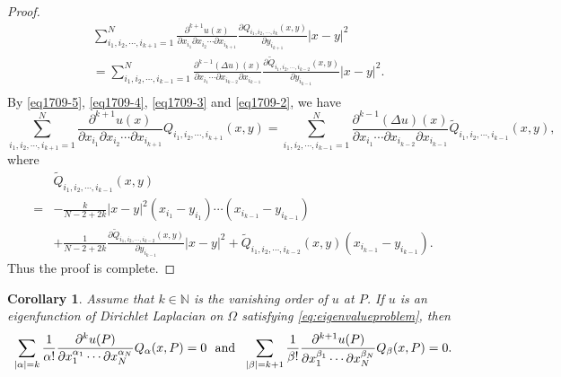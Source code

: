 \documentclass[11pt,reqno]{article}
\newtheorem{cor}[teo]{Corollary}
\numberwithin{equation}{section}
\newcommand\N{\mathbb N}
\renewcommand\O\Omega
\begin{document}
\begin{proof}
				\begin{equation}\label{eq1709-2}
					\begin{aligned}
						&\sum_{i_1,i_2,\cdots,i_{k+1}=1}^{N}\frac{\partial^{k+1} u(x)}{\partial x_{i_1} \partial x_{i_2}\cdots \partial x_{i_{k+1}}}\frac{\partial Q_{i_1,i_2,\cdots,i_k}(x,y)}{\partial y_{i_{k+1}}}|x-y|^2\\
						&=\sum_{i_1,i_2,\cdots,i_{k-1}=1}^{N}\frac{\partial^{k-1}(\Delta u)(x)}{\partial x_{i_1}\cdots \partial x_{i_{k-2}}\partial x_{i_{k-1}}}  \frac{\partial\widetilde{Q}_{i_1,i_2,\cdots,i_{k-2}}(x,y)}{\partial y_{i_{k-1}}}|x-y|^2.\\
					\end{aligned}
				\end{equation}
				By \eqref{eq1709-5}, \eqref{eq1709-4}, \eqref{eq1709-3} and \eqref{eq1709-2}, we have 
				\begin{equation}
					\sum_{i_1,i_2,\cdots,i_{k+1}=1}^{N}\frac{\partial^{k+1} u(x)}{\partial x_{i_1} \partial x_{i_2}\cdots \partial x_{i_{k+1}}}Q_{i_1,i_2,\cdots,i_{k+1}}(x,y)=\sum_{i_1,i_2,\cdots,i_{k-1}=1}^{N}\frac{\partial^{k-1}(\Delta u)(x)}{\partial x_{i_1}\cdots \partial x_{i_{k-2}}\partial x_{i_{k-1}}} \widetilde{Q}_{i_1,i_2,\cdots,i_{k-1}}(x,y),
				\end{equation}
				where $$
				\begin{aligned}
					&\widetilde{Q}_{i_1,i_2,\cdots,i_{k-1}}(x,y)\\
                    =&-\frac{k}{N-2+2k}|x-y|^2(x_{i_1}-y_{i_1})\cdots(x_{i_{k-1}}-y_{i_{k-1}})\\
					&+\frac{1}{N-2+2k}\frac{\partial\widetilde{Q}_{i_1,i_2,\cdots,i_{k-2}}(x,y)}{\partial y_{i_{k-1}}}|x-y|^2+\widetilde{Q}_{i_1,i_2,\cdots,i_{k-2}}(x,y)(x_{i_{k-1}}-y_{i_{k-1}}).
				\end{aligned}
				$$
				Thus the proof is complete.
                 \end{proof}
                 \begin{cor}\label{Cor-Q}
                 Assume that $k\in\N$ is the vanishing order of $u$ at $P$.
                     If $u$ is an eigenfunction of Dirichlet Laplacian on $\O$ satisfying \eqref{eq:eigenvalueproblem}, then
                      \begin{equation}\label{eq2904-2}
					\sum_{|\alpha|=k}\frac1{\alpha!}
					\frac{\partial^ku(P)}{\partial x_1^{\alpha_1}\cdots\partial x_N^{\alpha_N}}Q_\alpha(x,P)=0\ \ \hbox{and}\ \ 	\sum_{|\beta|=k+1}\frac1{\beta!}
					\frac{\partial^{k+1}u(P)}{\partial x_1^{\beta_1}\cdots\partial x_N^{\beta_N}}Q_\beta(x,P)=0.
				\end{equation}   
                 \end{cor}  
\end{document}
